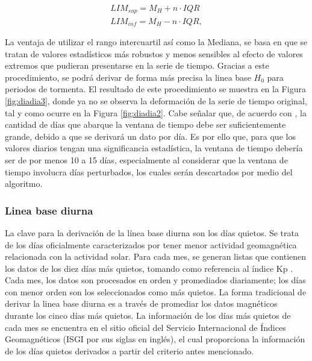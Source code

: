 \begin{equation}
\label{eq:iqr}
    \begin{split}
        LIM_{sup} = M_{H} + n \cdot IQR \\
        LIM_{inf} = M_{H} - n \cdot IQR,
    \end{split}    
\end{equation}

La ventaja de utilizar el rango intercuartil así como la Mediana, se basa en que se tratan de valores estadísticos más robustos y menos sensibles al efecto de valores extremos que pudieran presentarse en la serie de tiempo. Gracias a este procedimiento, se podrá derivar de forma más precisa la linea base $H_0$ para periodos de tormenta. El resultado de este procedimiento se muestra en la Figura \ref{fig:diadia3}, donde ya no se observa la deformación de la serie de tiempo original, tal y como ocurre en la Figura \ref{fig:diadia2}. Cabe señalar que, de acuerdo con \cite{baseline_Gjerloev}, la cantidad de días que abarque la ventana de tiempo debe ser suficientemente grande, debido a que se derivará un dato por día. Es por ello que, para que los valores diarios tengan una significancia estadística, la ventana de tiempo debería ser de por menos 10 a 15 días, especialmente al considerar que la ventana de tiempo involucra días perturbados, los cuales serán descartados por medio del algoritmo.
\vspace{1 em}

\subsubsection{Linea base diurna}

La clave para la derivación de la línea base diurna son los días quietos. Se trata de los días oficialmente caracterizados por tener menor actividad geomagnética relacionada con la actividad solar. Para cada mes, se generan listas que contienen los datos de los diez días más quietos, tomando como referencia al índice Kp \cite{BARTELS_kp}. Cada mes, los datos son procesados en orden y promediados diariamente; los días con menor orden son los seleccionados como más quietos. La forma tradicional de derivar la linea base diurna es a través de promediar los datos magnéticos durante los cinco días más quietos. La información de los días más quietos de cada mes se encuentra en el sitio oficial del Servicio Internacional de Índices Geomagnéticos (ISGI por sus siglas en inglés), el cual proporciona la información de los días quietos derivados a partir del criterio antes mencionado.
\vspace{1 em}


